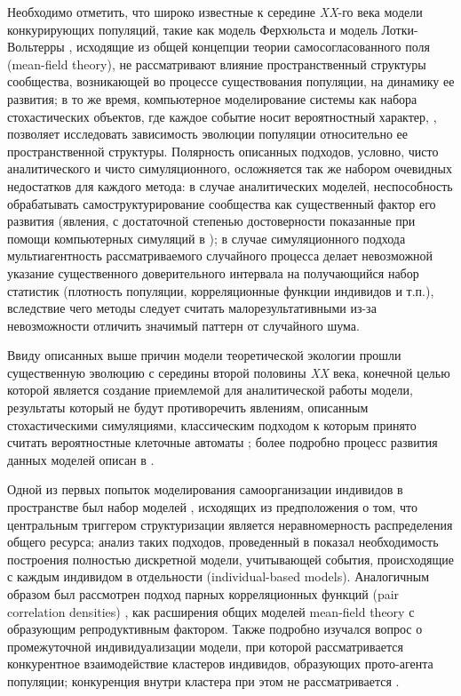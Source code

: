 Необходимо отметить, что широко известные к середине \textit{XX}-го века модели конкурирующих популяций, такие как модель Ферхюльста \cite{ferh} и модель Лотки-Вольтерры \cite{Lotka1925}, исходящие из общей концепции теории самосогласованного поля (mean-field theory), не рассматривают влияние пространственный структуры сообщества, возникающей во процессе существования популяции, на динамику ее развития; в то же время, компьютерное моделирование системы как набора стохастических объектов, где каждое событие носит вероятностный характер, \cite{Huston, JUDSON19949, lom}, позволяет исследовать зависимость эволюции популяции относительно ее пространственной структуры. Полярность описанных подходов, условно, чисто аналитического и чисто симуляционного, осложняется так же набором очевидных недостатков для каждого метода: в случае аналитических моделей, неспособность обрабатывать самоструктурирование сообщества как существенный фактор его развития (явления, с достаточной степенью достоверности показанные при помощи компьютерных симуляций в \cite{levin74, levin76,hols,pacsil,wein,weinc}); в случае симуляционного подхода мультиагентность рассматриваемого случайного процесса делает невозможной указание существенного доверительного интервала на получающийся набор статистик (плотность популяции, корреляционные функции индивидов и т.п.), вследствие чего методы следует считать малорезультативными из-за невозможности отличить значимый паттерн от случайного шума.

Ввиду описанных выше причин модели теоретической экологии прошли существенную эволюцию с середины второй половины \textit{XX} века, конечной целью которой является создание приемлемой для аналитической работы модели, результаты который не будут противоречить явлениям, описанным стохастическими симуляциями, классическим подходом к которым принято считать вероятностные клеточные автоматы \cite{HOGEWEG,velazquez}; более подробно процесс развития данных моделей описан в \cite{Plank2015}.

Одной из первых попыток моделирования самоорганизации индивидов в пространстве был набор моделей \cite{DURRETT1994363}, исходящих из предположения о том, что центральным триггером структуризации является неравномерность распределения общего ресурса; анализ таких подходов, проведенный в \cite{DURRETT1994363} показал необходимость построения полностью дискретной модели, учитывающей события, происходящие с каждым индивидом в отдельности (individual-based models). Аналогичным образом был рассмотрен подход парных корреляционных функций (pair correlation densities) \cite{YOUNG,FILIPE2001603}, как расширения общих моделей mean-field theory с образующим репродуктивным фактором. Также подробно изучался вопрос о промежуточной индивидуализации модели, при которой рассматривается конкурентное взаимодействие кластеров индивидов, образующих прото-агента популяции; конкуренция внутри кластера при этом не рассматривается \cite{Etienne2004105,metz,ROUS,CADET}.

